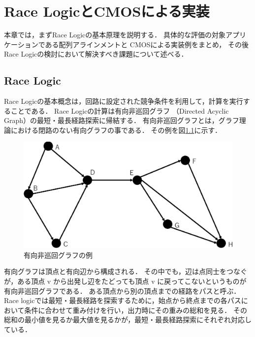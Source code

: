 \chapter{Race LogicとCMOSによる実装}
本章では，まずRace Logicの基本原理を説明する．
具体的な評価の対象アプリケーションである配列アラインメントと
CMOSによる実装例をまとめ，
その後Race Logicの検討において解決すべき課題について述べる．

\section{Race Logic}
Race Logicの基本概念は，回路に設定された競争条件を利用して，計算を実行することである．
Race Logicの計算は有向非巡回グラフ
（Directed Acyclic Graph）の最短・最長経路探索に帰結する．
有向非巡回グラフとは，グラフ理論における閉路のない有向グラフの事である．
その例を図\ref{fig:DAG}に示す．
\begin{figure}[t!]
\begin{center}
\includegraphics[keepaspectratio,scale=0.5]{fig/2/DAG.eps}
\caption{有向非巡回グラフの例}
\label{fig:DAG}
\end{center}
\end{figure}
有向グラフは頂点と有向辺から構成される．
その中でも，辺は点同士をつなぐが，ある頂点 v から出発し辺をたどっても頂点 v に戻ってこないというものが
有向非巡回グラフである．
ある頂点から別の頂点までの経路をパスと呼ぶ．
Race logicでは最短・最長経路を探索するために，始点から終点までの各パスにおいて条件に合わせて重み付けを行い，出力時にその重みの総和を見る．
その総和の最小値を見るか最大値を見るかが，最短・最長経路探索にそれぞれ対応している．

